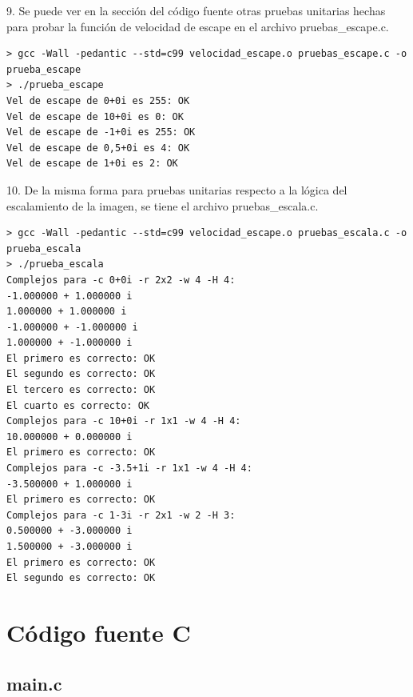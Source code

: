 \documentclass[a4paper,10pt]{article}
\begin{document}
9. Se puede ver en la sección del código fuente otras pruebas unitarias hechas para probar la función de velocidad de escape en el archivo pruebas_escape.c.
\begin{verbatim}
> gcc -Wall -pedantic --std=c99 velocidad_escape.o pruebas_escape.c -o prueba_escape
> ./prueba_escape
Vel de escape de 0+0i es 255: OK
Vel de escape de 10+0i es 0: OK
Vel de escape de -1+0i es 255: OK
Vel de escape de 0,5+0i es 4: OK
Vel de escape de 1+0i es 2: OK
\end{verbatim}

10. De la misma forma para pruebas unitarias respecto a la lógica del escalamiento de la imagen, se tiene el archivo pruebas_escala.c.
\begin{verbatim}
> gcc -Wall -pedantic --std=c99 velocidad_escape.o pruebas_escala.c -o prueba_escala
> ./prueba_escala
Complejos para -c 0+0i -r 2x2 -w 4 -H 4:
-1.000000 + 1.000000 i
1.000000 + 1.000000 i
-1.000000 + -1.000000 i
1.000000 + -1.000000 i
El primero es correcto: OK
El segundo es correcto: OK
El tercero es correcto: OK
El cuarto es correcto: OK
Complejos para -c 10+0i -r 1x1 -w 4 -H 4:
10.000000 + 0.000000 i
El primero es correcto: OK
Complejos para -c -3.5+1i -r 1x1 -w 4 -H 4:
-3.500000 + 1.000000 i
El primero es correcto: OK
Complejos para -c 1-3i -r 2x1 -w 2 -H 3:
0.500000 + -3.000000 i
1.500000 + -3.000000 i
El primero es correcto: OK
El segundo es correcto: OK
\end{verbatim}

\pagebreak


\section{C\'odigo fuente C}

\subsection{main.c}
\end{document}
